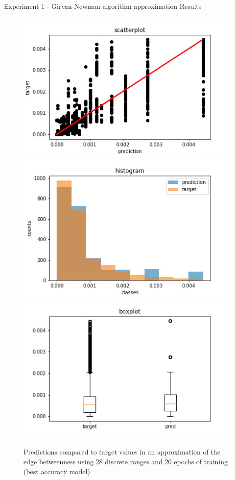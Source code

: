 \documentclass[xcolor=table]{beamer}
\begin{document}
\begin{frame}{Experiment 1 - Girvan-Newman algorithm approximation }{ Results}


\begin{figure}[H]
%
  \centering
    \includegraphics[width=0.9\linewidth]{img/GN_exp1/28bins/scatter_plot_20epochs.png}
\endminipage
{}%
  \centering
    \includegraphics[width=0.9\linewidth]{img/GN_exp1/28bins/histogram_20epochs.png}
\endminipage
{}%
  \centering
    \includegraphics[width=0.9\linewidth]{img/GN_exp1/28bins/boxplot_20epochs.png}
\endminipage
\caption{Predictions compared to target values in an approximation of the edge betweenness using 28 discrete ranges and 20 epochs of training (best accuracy model) }\label{fig:edgeb_exp1_10bins}
\end{figure}

\end{frame}
\end{document}
